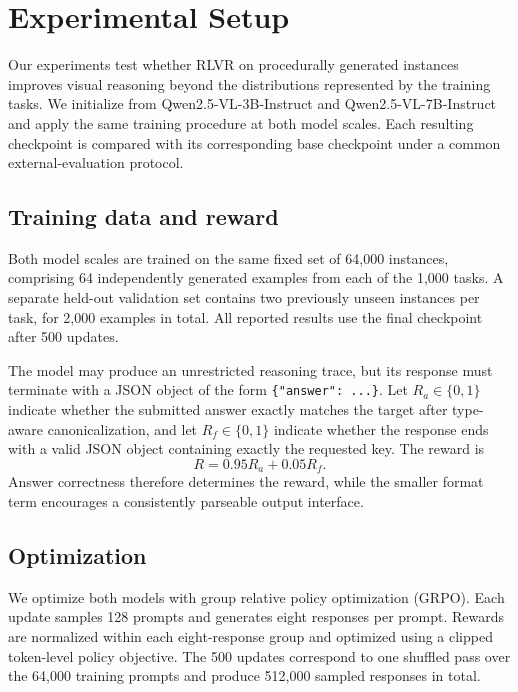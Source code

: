 \section{Experimental Setup}
\label{sec:experiments}

Our experiments test whether RLVR on procedurally generated \trace instances
improves visual reasoning beyond the distributions represented by the training
tasks. We initialize from Qwen2.5-VL-3B-Instruct and
Qwen2.5-VL-7B-Instruct~\citep{bai2025qwen25vl} and apply the same training
procedure at both model scales. Each resulting checkpoint is compared with its
corresponding base checkpoint under a common external-evaluation protocol.

\subsection{Training data and reward}

Both model scales are trained on the same fixed set of 64,000 instances,
comprising 64 independently generated examples from each of the 1,000 \trace
tasks. A separate held-out \trace validation set contains two previously unseen
instances per task, for 2,000 examples in total. All reported results use the
final checkpoint after 500 updates.

The model may produce an unrestricted reasoning trace, but its response must
terminate with a JSON object of the form
\texttt{\{"answer": ...\}}. Let $R_a \in \{0,1\}$ indicate whether the
submitted answer exactly matches the target after type-aware canonicalization,
and let $R_f \in \{0,1\}$ indicate whether the response ends with a valid JSON
object containing exactly the requested key. The reward is
\begin{equation}
  R = 0.95 R_a + 0.05 R_f.
\end{equation}
Answer correctness therefore determines the reward, while the smaller format
term encourages a consistently parseable output interface.

\subsection{Optimization}

We optimize both models with group relative policy optimization (GRPO). Each
update samples 128 prompts and generates eight responses per prompt. Rewards
are normalized within each eight-response group and optimized using a clipped
token-level policy objective. The 500 updates correspond to one shuffled pass
over the 64,000 training prompts and produce 512,000 sampled responses in
total.

